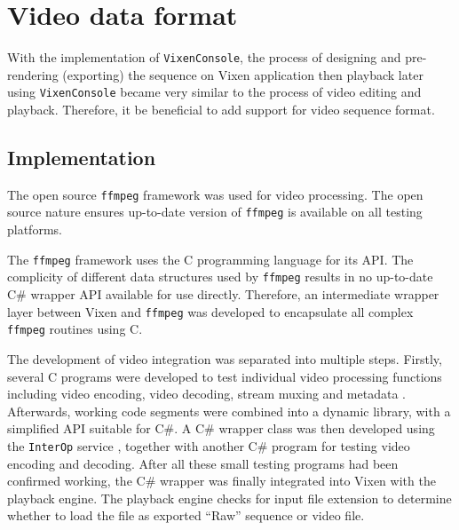

\section{Video data format}

With the implementation of \texttt{VixenConsole}, the process of designing and pre-rendering (exporting) the sequence on Vixen application then playback later using \texttt{VixenConsole} became very similar to the process of video editing and playback. Therefore, it  be beneficial to add support for video sequence format.

\subsection{Implementation}

The open source \texttt{ffmpeg} framework \cite{ffmpeg} was used for video processing. The open source nature ensures up-to-date version of \texttt{ffmpeg} is available on all testing platforms.

The \texttt{ffmpeg} framework uses the C programming language for its API. The complicity of different data structures used by \texttt{ffmpeg} results in no up-to-date C\# wrapper API available for use directly. Therefore, an intermediate wrapper layer between Vixen and \texttt{ffmpeg} was developed to encapsulate all complex \texttt{ffmpeg} routines using C.

The development of video integration was separated into multiple steps. Firstly, several C programs were developed to test individual video processing functions including video encoding, video decoding, stream muxing and metadata . Afterwards, working code segments were combined into a dynamic library, with a simplified API suitable for C\#. A C\# wrapper class was then developed using the \texttt{InterOp} service \cite{interop}, together with another C\# program for testing video encoding and decoding. After all these small testing programs had been confirmed working, the C\# wrapper was finally integrated into Vixen with the playback engine. The playback engine checks for  input file extension to determine whether to load the file as  exported ``Raw'' sequence or  video file.

